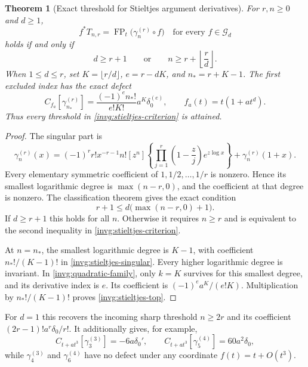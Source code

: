 \documentclass[11pt,a4paper]{article}
\newtheorem{theorem}{Theorem}[section]
\theoremstyle{definition}
\theoremstyle{remark}
\numberwithin{equation}{section}
\begin{document}
\begin{theorem}[Exact threshold for Stieltjes argument derivatives]
\label{invg:stieltjes-threshold}
For $r,n\ge0$ and $d\ge1$,
\[
 f^*T_{n,r}=\operatorname{FP}_t\bigl(\gamma_n^{(r)}\circ f\bigr)
 \quad\text{for every }f\in\mathscr G_d
\]
holds if and only if
\begin{equation}\label{invg:stieltjes-criterion}
 d\ge r+1\qquad\text{or}\qquad
 n\ge r+\left\lfloor\frac rd\right\rfloor.
\end{equation}
When $1\le d\le r$, set $K=\lfloor r/d\rfloor$, $e=r-dK$, and
$n_*=r+K-1$.  The first excluded index has the exact defect
\begin{equation}\label{invg:stieltjes-top}
 C_{f_a}[\gamma_{n_*}^{(r)}]
 =\frac{(-1)^e n_*!}{e!K!}a^K\delta_0^{(e)},
 \qquad f_a(t)=t(1+a t^d).
\end{equation}
Thus every threshold in \eqref{invg:stieltjes-criterion} is attained.
\end{theorem}

\begin{proof}
The singular part is
\begin{equation}\label{invg:stieltjes-singular}
 \gamma_n^{(r)}(x)
 =(-1)^rr!x^{-r-1}
 n![z^n]\left\{\prod_{j=1}^{r}\left(1-\frac zj\right)e^{z\log x}\right\}
 +\gamma_n^{(r)}(1+x).
\end{equation}
Every elementary symmetric coefficient of
$1,1/2,\ldots,1/r$ is nonzero.  Hence its smallest logarithmic degree is
$\max(n-r,0)$, and the coefficient at that degree is nonzero.
The classification theorem gives the exact condition
\[
 r+1\le d\bigl(\max(n-r,0)+1\bigr).
\]
If $d\ge r+1$ this holds for all $n$.  Otherwise it requires $n\ge r$
and is equivalent to the second inequality in
\eqref{invg:stieltjes-criterion}.

At $n=n_*$, the smallest logarithmic degree is $K-1$, with coefficient
$n_*!/(K-1)!$ in \eqref{invg:stieltjes-singular}.  Every higher
logarithmic degree is invariant.  In
\eqref{invg:quadratic-family}, only $k=K$ survives for this smallest
degree, and its derivative index is $e$.  Its coefficient is
$(-1)^ea^K/(e!K)$.  Multiplication by $n_*!/(K-1)!$ proves
\eqref{invg:stieltjes-top}.
\end{proof}

For $d=1$ this recovers the incoming sharp threshold $n\ge2r$ and its
coefficient $(2r-1)!a^r\delta_0/r!$.  It additionally gives, for example,
\[
 C_{t+a t^3}[\gamma_3^{(3)}]=-6a\delta_0',
 \qquad
 C_{t+a t^3}[\gamma_5^{(4)}]=60a^2\delta_0,
\]
while $\gamma_4^{(3)}$ and $\gamma_6^{(4)}$ have no defect under any
coordinate $f(t)=t+O(t^3)$.
\end{document}
